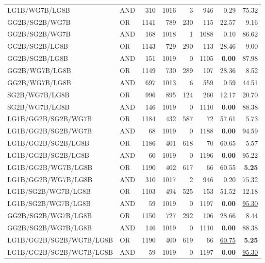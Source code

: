 \documentclass{article}
\begin{document}
{\begin{longtable}{llrrrrrr}
 LG1B/WG7B/LG8B           & AND     &  310 & 1016 &    3 &  946 & 0.29              & 75.32             \\
 GG2B/SG2B/WG7B           & OR      & 1141 &  789 &  230 &  115 & 22.57             & 9.16              \\
 GG2B/SG2B/WG7B           & AND     &  168 & 1018 &    1 & 1088 & 0.10              & 86.62             \\
 GG2B/SG2B/LG8B           & OR      & 1143 &  729 &  290 &  113 & 28.46             & 9.00              \\
 GG2B/SG2B/LG8B           & AND     &  151 & 1019 &    0 & 1105 & \textbf{0.00}     & 87.98             \\
 GG2B/WG7B/LG8B           & OR      & 1149 &  730 &  289 &  107 & 28.36             & 8.52              \\
 GG2B/WG7B/LG8B           & AND     &  697 & 1013 &    6 &  559 & 0.59              & 44.51             \\
 SG2B/WG7B/LG8B           & OR      &  996 &  895 &  124 &  260 & 12.17             & 20.70             \\
 SG2B/WG7B/LG8B           & AND     &  146 & 1019 &    0 & 1110 & \textbf{0.00}     & 88.38             \\
 LG1B/GG2B/SG2B/WG7B      & OR      & 1184 &  432 &  587 &   72 & 57.61             & 5.73              \\
 LG1B/GG2B/SG2B/WG7B      & AND     &   68 & 1019 &    0 & 1188 & \textbf{0.00}     & 94.59             \\
 LG1B/GG2B/SG2B/LG8B      & OR      & 1186 &  401 &  618 &   70 & 60.65             & 5.57              \\
 LG1B/GG2B/SG2B/LG8B      & AND     &   60 & 1019 &    0 & 1196 & \textbf{0.00}     & 95.22             \\
 LG1B/GG2B/WG7B/LG8B      & OR      & 1190 &  402 &  617 &   66 & 60.55             & \textbf{5.25}     \\
 LG1B/GG2B/WG7B/LG8B      & AND     &  310 & 1017 &    2 &  946 & 0.20              & 75.32             \\
 LG1B/SG2B/WG7B/LG8B      & OR      & 1103 &  494 &  525 &  153 & 51.52             & 12.18             \\
 LG1B/SG2B/WG7B/LG8B      & AND     &   59 & 1019 &    0 & 1197 & \textbf{0.00}     & \underline{95.30} \\
 GG2B/SG2B/WG7B/LG8B      & OR      & 1150 &  727 &  292 &  106 & 28.66             & 8.44              \\
 GG2B/SG2B/WG7B/LG8B      & AND     &  146 & 1019 &    0 & 1110 & \textbf{0.00}     & 88.38             \\
 LG1B/GG2B/SG2B/WG7B/LG8B & OR      & 1190 &  400 &  619 &   66 & \underline{60.75} & \textbf{5.25}     \\
 LG1B/GG2B/SG2B/WG7B/LG8B & AND     &   59 & 1019 &    0 & 1197 & \textbf{0.00}     & \underline{95.30} \\

\end{longtable}
}
\end{document}
